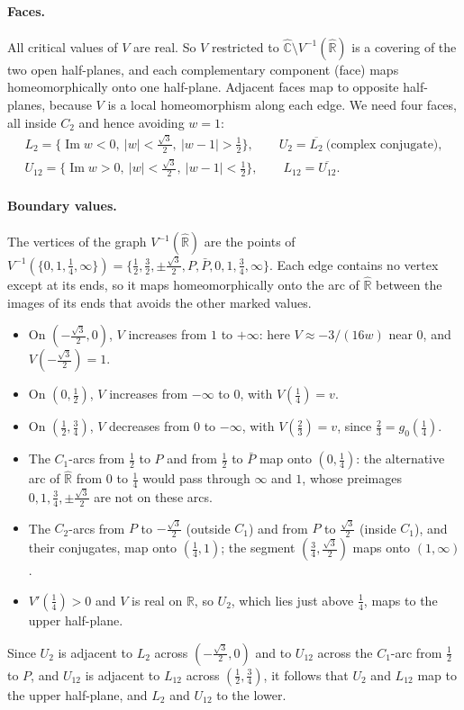 \documentclass[11pt]{article}
\theoremstyle{definition}
\newcommand{\Ch}{\hat{\mathbb C}}
\newcommand{\Rh}{\hat{\mathbb R}}
\newcommand{\Img}{\operatorname{Im}}
\begin{document}
\paragraph{Faces.} All critical values of $V$ are real. So $V$ restricted to $\Ch\setminus V^{-1}(\Rh)$ is a covering of the two open half-planes, and each complementary component (face) maps homeomorphically onto one half-plane. Adjacent faces map to opposite half-planes, because $V$ is a local homeomorphism along each edge. We need four faces, all inside $C_2$ and hence avoiding $w=1$:
\begin{gather*}
L_2=\{\Img w<0,\ |w|<\tfrac{\sqrt3}2,\ |w-1|>\tfrac12\},\qquad U_2=\overline{L_2}\ \text{(complex conjugate)},\\
U_{12}=\{\Img w>0,\ |w|<\tfrac{\sqrt3}2,\ |w-1|<\tfrac12\},\qquad L_{12}=\overline{U_{12}}.
\end{gather*}

\paragraph{Boundary values.} The vertices of the graph $V^{-1}(\Rh)$ are the points of $V^{-1}(\{0,1,\tfrac14,\infty\})=\{\tfrac12,\tfrac32,\pm\tfrac{\sqrt3}2,P,\bar P,0,1,\tfrac34,\infty\}$. Each edge contains no vertex except at its ends, so it maps homeomorphically onto the arc of $\Rh$ between the images of its ends that avoids the other marked values.
\begin{itemize}[nosep]
\item On $(-\tfrac{\sqrt3}2,0)$, $V$ increases from $1$ to $+\infty$: here $V\approx-3/(16w)$ near $0$, and $V(-\tfrac{\sqrt3}2)=1$.
\item On $(0,\tfrac12)$, $V$ increases from $-\infty$ to $0$, with $V(\tfrac14)=v$.
\item On $(\tfrac12,\tfrac34)$, $V$ decreases from $0$ to $-\infty$, with $V(\tfrac23)=v$, since $\tfrac23=g_0(\tfrac14)$.
\item The $C_1$-arcs from $\tfrac12$ to $P$ and from $\tfrac12$ to $\bar P$ map onto $(0,\tfrac14)$: the alternative arc of $\Rh$ from $0$ to $\tfrac14$ would pass through $\infty$ and $1$, whose preimages $0,1,\tfrac34,\pm\tfrac{\sqrt3}2$ are not on these arcs.
\item The $C_2$-arcs from $P$ to $-\tfrac{\sqrt3}2$ (outside $C_1$) and from $P$ to $\tfrac{\sqrt3}2$ (inside $C_1$), and their conjugates, map onto $(\tfrac14,1)$; the segment $(\tfrac34,\tfrac{\sqrt3}2)$ maps onto $(1,\infty)$.
\item $V'(\tfrac14)>0$ and $V$ is real on $\mathbb R$, so $U_2$, which lies just above $\tfrac14$, maps to the upper half-plane.
\end{itemize}
Since $U_2$ is adjacent to $L_2$ across $(-\tfrac{\sqrt3}2,0)$ and to $U_{12}$ across the $C_1$-arc from $\tfrac12$ to $P$, and $U_{12}$ is adjacent to $L_{12}$ across $(\tfrac12,\tfrac34)$, it follows that $U_2$ and $L_{12}$ map to the upper half-plane, and $L_2$ and $U_{12}$ to the lower.
\end{document}
